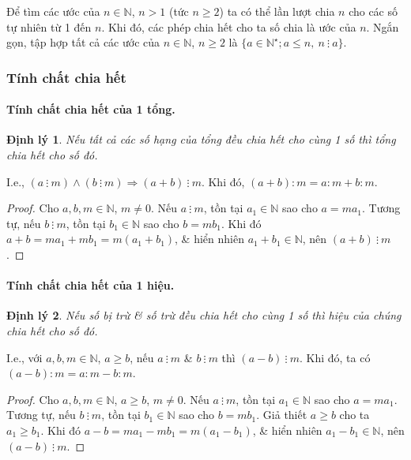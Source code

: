 \documentclass{article}
\numberwithin{equation}{section}
\newtheorem{theorem}{Định lý}[section]
\begin{document}
Để tìm các ước của $n\in\mathbb{N}$, $n > 1$ (tức $n\ge 2$) ta có thể lần lượt chia $n$ cho các số tự nhiên từ 1 đến $n$. Khi đó, các phép chia hết cho ta số chia là ước của $n$. Ngắn gọn, tập hợp tất cả các ước của $n\in\mathbb{N}$, $n\ge 2$ là $\{a\in\mathbb{N}^\star;a\le n,\ n\ \vdots\ a\}$.

\subsubsection{Tính chất chia hết}

\paragraph{Tính chất chia hết của 1 tổng.}
\begin{theorem}
	Nếu tất cả các số hạng của tổng đều chia hết cho cùng 1 số thì tổng chia hết cho số đó.
\end{theorem}
I.e., $(a\ \vdots\ m)\land(b\ \vdots\ m)\Rightarrow(a + b)\ \vdots\ m$. Khi đó, $(a + b):m = a:m + b:m$.

\begin{proof}[Proof]
	Cho $a,b,m\in\mathbb{N}$, $m\ne 0$. Nếu $a\ \vdots\ m$, tồn tại $a_1\in\mathbb{N}$ sao cho $a = ma_1$. Tương tự, nếu $b\ \vdots\ m$, tồn tại $b_1\in\mathbb{N}$ sao cho $b = mb_1$. Khi đó $a + b = ma_1 + mb_1 = m(a_1 + b_1)$, \& hiển nhiên $a_1 + b_1\in\mathbb{N}$, nên $(a + b)\ \vdots\ m$.
\end{proof}

\paragraph{Tính chất chia hết của 1 hiệu.}
\begin{theorem}
	Nếu số bị trừ \& số trừ đều chia hết cho cùng 1 số thì hiệu của chúng chia hết cho số đó.
\end{theorem}
I.e., với $a,b,m\in\mathbb{N}$, $a\ge b$, nếu $a\ \vdots\ m$ \& $b\ \vdots\ m$ thì $(a - b)\ \vdots\ m$. Khi đó, ta có $(a - b):m = a:m - b:m$.

\begin{proof}[Proof]
	Cho $a,b,m\in\mathbb{N}$, $a\ge b$, $m\ne 0$. Nếu $a\ \vdots\ m$, tồn tại $a_1\in\mathbb{N}$ sao cho $a = ma_1$. Tương tự, nếu $b\ \vdots\ m$, tồn tại $b_1\in\mathbb{N}$ sao cho $b = mb_1$. Giả thiết $a\ge b$ cho ta $a_1\ge b_1$. Khi đó $a - b = ma_1 - mb_1 = m(a_1 - b_1)$, \& hiển nhiên $a_1 - b_1\in\mathbb{N}$, nên $(a - b)\ \vdots\ m$.
\end{proof}
\end{document}
